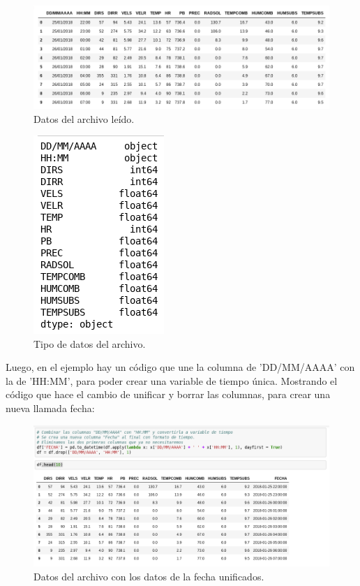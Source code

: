 \documentclass[a4paper]{article}
\begin{document}
\begin{figure}[h!]
  \includegraphics[width=\linewidth]{Tabla_dfHead.png}
  \caption{Datos del archivo leído.}
\end{figure}

\begin{figure}[h!]
  \centering
  \includegraphics[width=0.3\linewidth]{Tabla_dfTypes.png}
  \caption{Tipo de datos del archivo.}
\end{figure}

Luego, en el ejemplo hay un código que une la columna de 'DD/MM/AAAA' con la de 'HH:MM', para poder crear una variable de tiempo única. Mostrando el código que hace el cambio de unificar y borrar las columnas, para crear una nueva llamada fecha: 
\begin{figure}[h!]
  \includegraphics[width=\linewidth]{Tabla_dfHead2.png}
  \caption{Datos del archivo con los datos de la fecha unificados.}
\end{figure}
\end{document}
